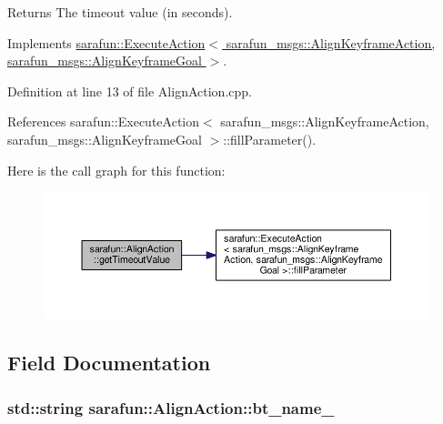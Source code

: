 \begin{DoxyReturn}{Returns}
The timeout value (in seconds). 
\end{DoxyReturn}


Implements \hyperlink{classsarafun_1_1ExecuteAction_aba6cfa8a8ce19e735eb6394424df6d17_aba6cfa8a8ce19e735eb6394424df6d17}{sarafun\-::\-Execute\-Action$<$ sarafun\-\_\-msgs\-::\-Align\-Keyframe\-Action, sarafun\-\_\-msgs\-::\-Align\-Keyframe\-Goal $>$}.



Definition at line 13 of file Align\-Action.\-cpp.



References sarafun\-::\-Execute\-Action$<$ sarafun\-\_\-msgs\-::\-Align\-Keyframe\-Action, sarafun\-\_\-msgs\-::\-Align\-Keyframe\-Goal $>$\-::fill\-Parameter().



Here is the call graph for this function\-:
\nopagebreak
\begin{figure}[H]
\begin{center}
\leavevmode
\includegraphics[width=350pt]{dc/df5/classsarafun_1_1AlignAction_a9b9741ec3203bdc1b2e7b7cecc96e6ed_a9b9741ec3203bdc1b2e7b7cecc96e6ed_cgraph}
\end{center}
\end{figure}




\subsection{Field Documentation}
\hypertarget{classsarafun_1_1AlignAction_a832ecc3a169caf20ce7cb6f45d1551e3_a832ecc3a169caf20ce7cb6f45d1551e3}{
\subsubsection[{bt\-\_\-name\-\_\-}]{\setlength{\rightskip}{0pt plus 5cm}std\-::string sarafun\-::\-Align\-Action\-::bt\-\_\-name\-\_\-\hspace{0.3cm}{\ttfamily [private]}}}\label{classsarafun_1_1AlignAction_a832ecc3a169caf20ce7cb6f45d1551e3_a832ecc3a169caf20ce7cb6f45d1551e3}


